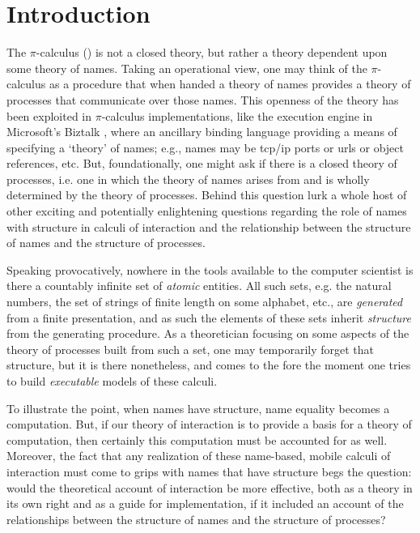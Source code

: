 \documentclass[]{entcs}
\newcommand{\pic}{$\pi$-calculus}
\begin{document}
\section{Introduction}

The {\pic} (\cite{milner91polyadicpi}) is not a closed theory, but
rather a theory dependent upon some theory of names. Taking an
operational view, one may think of the {\pic} as a procedure that when
handed a theory of names provides a theory of processes that
communicate over those names. This openness of the theory has been
exploited in {\pic} implementations, like the execution engine in
Microsoft's Biztalk \cite{biztalk}, where an ancillary binding
language providing a means of specifying a `theory' of names; e.g.,
names may be tcp/ip ports or urls or object references, etc. But,
foundationally, one might ask if there is a closed theory of
processes, i.e. one in which the theory of names arises from and is
wholly determined by the theory of processes. Behind this question
lurk a whole host of other exciting and potentially enlightening
questions regarding the role of names with structure in calculi of
interaction and the relationship between the structure of names and
the structure of processes.

Speaking provocatively, nowhere in the tools available to the computer
scientist is there a countably infinite set of \textit{atomic}
entities. All such sets, e.g. the natural numbers, the set of strings
of finite length on some alphabet, etc., are \textit{generated} from a
finite presentation, and as such the elements of these sets inherit
\textit{structure} from the generating procedure. As a theoretician
focusing on some aspects of the theory of processes built from such a
set, one may temporarily forget that structure, but it is there
nonetheless, and comes to the fore the moment one tries to build
\textit{executable} models of these calculi. 

To illustrate the point, when names have structure, name equality
becomes a computation. But, if our theory of interaction is to provide
a basis for a theory of computation, then certainly this computation
must be accounted for as well. Moreover, the fact that any realization
of these name-based, mobile calculi of interaction must come to grips
with names that have structure begs the question: would the
theoretical account of interaction be more effective, both as a theory
in its own right and as a guide for implementation, if it included an
account of the relationships between the structure of names and the
structure of processes?
\end{document}
